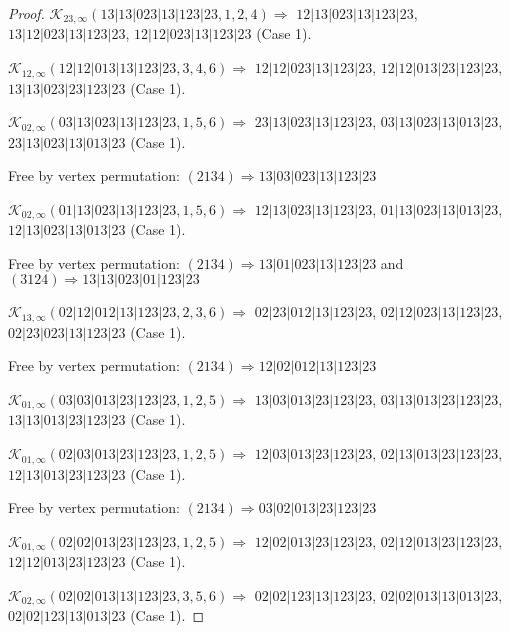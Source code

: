 \documentclass[12pt]{article}
\theoremstyle{plain}
\theoremstyle{definition}
\theoremstyle{remark}
\newcommand{\fancy}[1]{\mathcal{#1}}
\def\K{\fancy{K}}
\begin{document}
\begin{proof}
	\bigskip
	
	$\K_{23,\infty}(13|13|023|13|123|23,1, 2, 4)\Rightarrow $ $12|13|023|13|123|23$, $13|12|023|13|123|23$, $12|12|023|13|123|23$ (Case 1).
	
	\bigskip
	
	$\K_{12,\infty}(12|12|013|13|123|23,3, 4, 6)\Rightarrow $ $12|12|023|13|123|23$, $12|12|013|23|123|23$, $13|13|023|23|123|23$ (Case 1).
	
	\bigskip
	
	$\K_{02,\infty}(03|13|023|13|123|23,1, 5, 6)\Rightarrow $ $23|13|023|13|123|23$, $03|13|023|13|013|23$, $23|13|023|13|013|23$ (Case 1).
	
	
	
	Free by vertex permutation: $(2 1 3 4)\Rightarrow 13|03|023|13|123|23$
	
	
	\bigskip
	
	$\K_{02,\infty}(01|13|023|13|123|23,1, 5, 6)\Rightarrow $ $12|13|023|13|123|23$, $01|13|023|13|013|23$, $12|13|023|13|013|23$ (Case 1).
	
	
	
	Free by vertex permutation: $(2 1 3 4)\Rightarrow 13|01|023|13|123|23$ and $(3 1 2 4)\Rightarrow 13|13|023|01|123|23$
	
	
	\bigskip
	
	$\K_{13,\infty}(02|12|012|13|123|23,2, 3, 6)\Rightarrow $ $02|23|012|13|123|23$, $02|12|023|13|123|23$, $02|23|023|13|123|23$ (Case 1).
	
	
	
	Free by vertex permutation: $(2 1 3 4)\Rightarrow 12|02|012|13|123|23$
	
	
	\bigskip
	
	$\K_{01,\infty}(03|03|013|23|123|23,1, 2, 5)\Rightarrow $ $13|03|013|23|123|23$, $03|13|013|23|123|23$, $13|13|013|23|123|23$ (Case 1).
	
	\bigskip
	
	$\K_{01,\infty}(02|03|013|23|123|23,1, 2, 5)\Rightarrow $ $12|03|013|23|123|23$, $02|13|013|23|123|23$, $12|13|013|23|123|23$ (Case 1).
	
	
	
	Free by vertex permutation: $(2 1 3 4)\Rightarrow 03|02|013|23|123|23$
	
	
	\bigskip
	
	$\K_{01,\infty}(02|02|013|23|123|23,1, 2, 5)\Rightarrow $ $12|02|013|23|123|23$, $02|12|013|23|123|23$, $12|12|013|23|123|23$ (Case 1).
	
	\bigskip
	
	$\K_{02,\infty}(02|02|013|13|123|23,3, 5, 6)\Rightarrow $ $02|02|123|13|123|23$, $02|02|013|13|013|23$, $02|02|123|13|013|23$ (Case 1).
	

\end{proof}
\end{document}
